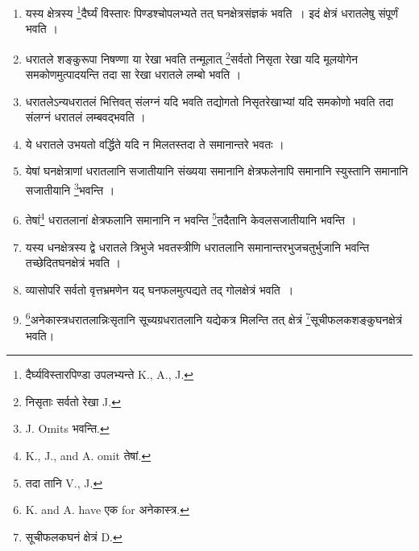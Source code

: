 \documentclass[11pt, openany]{book}
\begin{document}
\begin{enumerate}

\item[१] यस्य क्षेत्रस्य \renewcommand{\thefootnote}{२}\footnote{दैर्घ्यविस्तारपिण्डा उपलभ्यन्ते {\en K., A., J.}}दैर्घ्यं विस्तारः पिण्डश्चोपलभ्यते तत् घनक्षेत्रसंज्ञकं भवति~। इदं क्षेत्रं धरातलेषु संपूर्णं भवति ।

\item[२] धरातले शङ्कुरूपा निषण्णा या रेखा भवति तन्मूलात् \renewcommand{\thefootnote}{३}\footnote{निसृताः सर्वतो रेखा {\en J.} }सर्वतो निसृता रेखा यदि मूलयोगेन समकोणमुत्पादयन्ति तदा सा रेखा धरातले लम्बो भवति ।

\item[3] धरातलेऽन्यधरातलं भित्तिवत् संलग्नं यदि भवति तद्योगतो निसृतरेखाभ्यां यदि समकोणो भवति तदा संलग्नं धरातलं लम्बवद्भवति ।

\item[४] ये धरातले उभयतो वर्द्धिते यदि न मिलतस्तदा ते समानान्तरे
भवतः ।

\item[५] येषां घनक्षेत्राणां धरातलानि सजातीयानि संख्यया समानानि
 क्षेत्रफलेनापि समानानि स्युस्तानि समानानि सजातीयानि \renewcommand{\thefootnote}{४}\footnote{{\en J. Omits} भवन्ति.}भवन्ति ।

\item[६]  तेषां\renewcommand{\thefootnote}{५}\footnote{{\en K., J., and A. omit} तेषां. } धरातलानां क्षेत्रफलानि समानानि न भवन्ति \renewcommand{\thefootnote}{६}\footnote{तदा तानि {\en V., J.} }तदैतानि
केवलसजातीयानि भवन्ति ।

\item[७] यस्य धनक्षेत्रस्य द्वे धरातले त्रिभुजे भवतस्त्रीणि धरातलानि समानान्तरभुजचतुर्भुजानि भवन्ति तच्छेदितघनक्षेत्रं भवति ।

\item[८] व्यासोपरि सर्वतो वृत्तभ्रमणेन यद् घनफलमुत्पद्यते तद् गोलक्षेत्रं भवति~।

\item[९] \renewcommand{\thefootnote}{७}\footnote{{\en K. and A. have} एक {\en for} अनेकास्त्र. }अनेकास्त्रधरातलान्निःसृतानि सूच्यग्रधरातलानि यद्येकत्र मिलन्ति तत् क्षेत्रं \renewcommand{\thefootnote}{८}\footnote{सूचीफलकघनं क्षेत्रं {\en D.}}सूचीफलकशङ्कुघनक्षेत्रं भवति।

\end{enumerate}

\newpage
  
\end{document}
